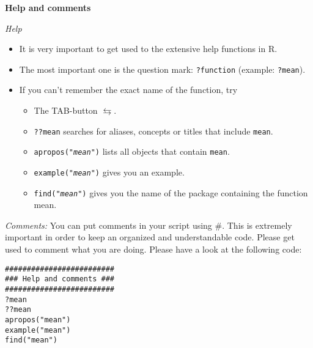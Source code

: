 \begin{Solution}{1.4}
\textbf{Help and comments}

\emph{Help}
\begin{itemize}
\item It is very important to get used to the extensive help functions in R.
\item The most important one is the question mark: \texttt{?function} (example: \texttt{?mean}).
\item If you can't remember the exact name of the function, try
   \begin{itemize}
     \item The TAB-button $\leftrightarrows$.
     \item \texttt{??mean} searches for aliases, concepts or titles that include \texttt{mean}.
     \item \texttt{apropos("\emph{mean}")} lists all objects that contain \texttt{mean}.
     \item \texttt{example("\emph{mean}")} gives you an example.
     \item \texttt{find("\emph{mean}")} gives you the name of the package containing the function mean.
   \end{itemize}
\end{itemize}

\emph{Comments:} You can put comments in your script using \#. This is extremely important in order to keep an organized and understandable code. Please get used to comment what you are doing. Please have a look at the following code:
\begin{verbatim}
#########################
### Help and comments ###
#########################
?mean
??mean
apropos("mean")
example("mean")
find("mean")
\end{verbatim}
\end{Solution}
